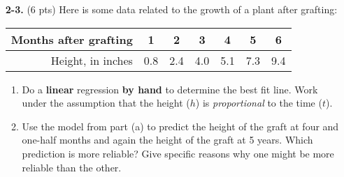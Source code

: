 \documentclass[12pt]{article}
\begin{document}
\begin{enumerate}
\item[\bf 2-3.] 
(6 pts) Here is some data related to the growth of a plant after grafting:
\begin{center}
\begin{tabular}{|r|cccccc|}\hline
Months after grafting & 1 & 2 & 3 & 4 & 5 & 6 \\ \hline
Height, in inches & 0.8 & 2.4 & 4.0 & 5.1 & 7.3 & 9.4  \\ \hline
\end{tabular}
\end{center}

\begin{enumerate}
\item Do a {\bf linear} regression {\bf by hand} to determine the best fit line.   Work under the assumption that the height ($h$) is {\em proportional} to the time ($t$). 
\item Use the model from part (a) to predict the height of the graft at four and one-half months and again the height of the graft at 5 years.  Which prediction is more reliable?  Give specific reasons why one might be more reliable than the other.
\end{enumerate}

\end{enumerate}
\end{document}
